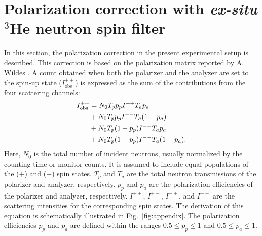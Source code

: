 \documentclass[%
 reprint,
superscriptaddress,
 amsmath,amssymb,
 aps,
floatfix,
]{revtex4-2}
\newcommand{\He}{$^3$He }
\begin{document}
\section{Polarization correction with \textit{ex-situ} \He neutron spin filter}
\label{appendix}
In this section, the polarization correction in the present experimental setup is described.
This correction is based on the polarization matrix reported by A. Wildes \cite{wildes_polarizer-analyzer_1999,wildes_scientific_2006}.
A count obtained when both the polarizer and the analyzer are set to the spin-up state ($I^{++}_\mathrm{obs}$) is expressed as the sum of the contributions from the four scattering channels:
\begin{align}
    I^{++}_\mathrm{obs} &= N_0 T_p p_p I^{++} T_a p_a \notag \\
    &+ N_0 T_p p_p I^{+-} T_a (1-p_a) \notag\\
    &+N_0 T_p (1-p_p) I^{-+} T_a p_a \notag \\
    &+ N_0 T_p (1-p_p) I^{--} T_a (1-p_a).
    \label{eq:Ipp}
\end{align}
Here, $N_0$ is the total number of incident neutrons, usually normalized by the counting time or monitor counts.
It is assumed to include equal populations of the ($+$) and ($-$) spin states.
$T_p$ and $T_a$ are the total neutron transmissions of the polarizer and analyzer, respectively.
$p_p$ and $p_a$ are the polarization efficiencies of the polarizer and analyzer, respectively.
$I^{++}$, $I^{+-}$, $I^{-+}$, and $I^{--}$ are the scattering intensities for the corresponding spin states.
The derivation of this equation is schematically illustrated in Fig.~\ref{fig:appendix}.
The polarization efficiencies $p_p$ and $p_a$ are defined within the ranges $0.5 \leq p_p \leq 1$ and $0.5 \leq p_a \leq 1$.
\end{document}
